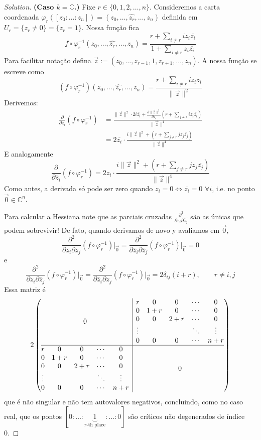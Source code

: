 \begin{proof}[Solution]
\textbf{(Caso \(k=\mathbb{C}\).)} Fixe \(r \in \{0,1,2,\ldots,n\}\). Consideremos a carta coordenada \(\varphi_r([z_0:\ldots:z_n])	= (z_0,\ldots,\widehat{z_r},\ldots,z_n)\) definida em \(U_r=\{z_r \neq 0\}=\{z_r=1\}\). Nossa função fica
	\[f \circ \varphi_r^{-1}(z_0,\ldots,\widehat{z_r},\ldots,z_n)=\frac{r+\sum_{i\neq r}iz_i\overline{z_i}}{1+\sum_{i\neq r}z_i\overline{z_i}}\]
Para facilitar notação defina \(\vec{z}:=(z_0,\ldots,z_{r-1},1,z_{r+1},\ldots,z_n)\). A nossa função se escreve como
\[(f \circ \varphi_r^{-1})(z_0,\ldots,\widehat{z_r},\ldots,z_n)=\frac{r+\sum_{i\neq r}iz_i\overline{z_i}}{\|\vec{z}\|^2}\]
Derivemos:
\begin{align*}
\frac{\partial }{\partial z_i}(f \circ \varphi_r^{-1})&=\frac{\|\vec{z}\|^2\cdot 2i\overline{z_i}+\frac{\partial \|\vec{z}\|^2}{\partial z_i}\left(r+\sum_{j \neq r}iz_i\overline{z_i}\right) }{\|\vec{z}\|^4}\\
&=2\overline{z_i}\cdot  \frac{i \|\vec{z}\|^2+\left(r+\sum_{j \neq r}jz_j\overline{z_j}\right) }{\|\vec{z}\|^4}
\end{align*}
E analogamente
\[\frac{\partial }{\partial \overline{z}_i}(f \circ \varphi_r^{-1})=2z_i\cdot  \frac{i \|\vec{z}\|^2+\left(r+\sum_{j \neq r}jz_j\overline{z_j}\right) }{\|\vec{z}\|^4}
\]
Como antes, a derivada só pode ser zero quando \(z_i=0 \iff \overline{z_i}=0\) \(\forall i\), i.e. no ponto \(\vec{0}\in \mathbb{C}^n\).

Para calcular a Hessiana note que as parciais cruzadas \(\frac{\partial^2 }{\partial z_i\partial \overline{z}_j}\) são as únicas que podem sobrevivir! De fato, quando derivamos de novo y avaliamos em \(\vec{0}\),
\[\frac{\partial^2}{\partial z_i \partial z_j }(f \circ \varphi_r^{-1})\Big|_{\vec{0}}=\frac{\partial^2 }{\partial \bar{z}_i\partial \bar{z}_j}(f \circ \varphi_r^{-1})\Big|_{\vec{0}}=0\]
e
\[\frac{\partial^2 }{\partial z_i\partial \bar{z}_j}(f \circ \varphi_r^{-1})\Big|_{\vec{0}}=\frac{\partial^2 }{\partial \bar{z}_i\partial z_j}(f \circ \varphi_r^{-1})\Big|_{\vec{0}}=2\delta_{ij}(i+r), \qquad  r\neq i,j\]
Essa matriz é
\[2\left(\begin{array}{@{}c|c@{}}
0&\begin{matrix} r & 0 &0 & \cdots &0\\
0 & 1+r & 0& \cdots & 0\\
0 & 0 & 2+r & \cdots & 0\\
\vdots & & &\ddots &\vdots \\
0 & 0 & 0 & \cdots & n+r\end{matrix}\\
\hline
\begin{matrix} r & 0 &0 & \cdots &0\\
0 & 1+r & 0& \cdots & 0\\
0 & 0 & 2+r & \cdots & 0\\
\vdots & & &\ddots &\vdots \\
0 & 0 & 0 & \cdots & n+r\end{matrix}&0\end{array}\right)\]
que é não singular e não tem autovalores negativos, concluindo, como no caso real, que os pontos \([0:\ldots:\underbrace{1}_{r\text{-th place} }:\ldots:0]\) são críticos não degenerados de índice 0.

\end{proof}

